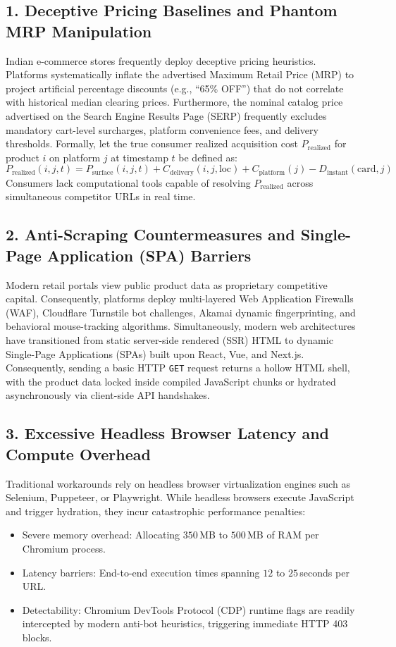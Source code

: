 \documentclass[12pt,a4paper,oneside]{report}
\begin{document}
\subsection{1. Deceptive Pricing Baselines and Phantom MRP Manipulation}
Indian e-commerce stores frequently deploy deceptive pricing heuristics. Platforms systematically inflate the advertised Maximum Retail Price (MRP) to project artificial percentage discounts (e.g., ``65\% OFF'') that do not correlate with historical median clearing prices. Furthermore, the nominal catalog price advertised on the Search Engine Results Page (SERP) frequently excludes mandatory cart-level surcharges, platform convenience fees, and delivery thresholds. Formally, let the true consumer realized acquisition cost $P_{\text{realized}}$ for product $i$ on platform $j$ at timestamp $t$ be defined as:
\begin{equation}
P_{\text{realized}}(i,j,t) = P_{\text{surface}}(i,j,t) + C_{\text{delivery}}(i,j,\text{loc}) + C_{\text{platform}}(j) - D_{\text{instant}}(\text{card}, j)
\end{equation}
Consumers lack computational tools capable of resolving $P_{\text{realized}}$ across simultaneous competitor URLs in real time.

\subsection{2. Anti-Scraping Countermeasures and Single-Page Application (SPA) Barriers}
Modern retail portals view public product data as proprietary competitive capital. Consequently, platforms deploy multi-layered Web Application Firewalls (WAF), Cloudflare Turnstile bot challenges, Akamai dynamic fingerprinting, and behavioral mouse-tracking algorithms. Simultaneously, modern web architectures have transitioned from static server-side rendered (SSR) HTML to dynamic Single-Page Applications (SPAs) built upon React, Vue, and Next.js. Consequently, sending a basic HTTP \texttt{GET} request returns a hollow HTML shell, with the product data locked inside compiled JavaScript chunks or hydrated asynchronously via client-side API handshakes.

\subsection{3. Excessive Headless Browser Latency and Compute Overhead}
Traditional workarounds rely on headless browser virtualization engines such as Selenium, Puppeteer, or Playwright. While headless browsers execute JavaScript and trigger hydration, they incur catastrophic performance penalties:
\begin{itemize}
    \item Severe memory overhead: Allocating $350$\,MB to $500$\,MB of RAM per Chromium process.
    \item Latency barriers: End-to-end execution times spanning $12$ to $25$\,seconds per URL.
    \item Detectability: Chromium DevTools Protocol (CDP) runtime flags are readily intercepted by modern anti-bot heuristics, triggering immediate HTTP 403 blocks.
\end{itemize}
\end{document}
